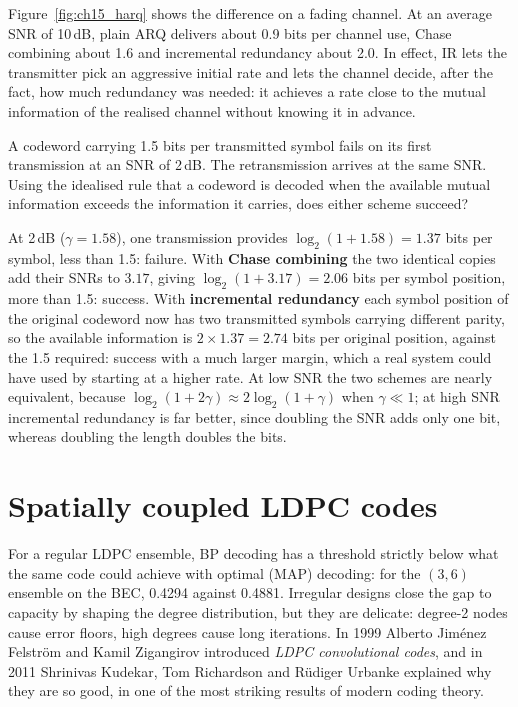 Figure~\ref{fig:ch15_harq} shows the difference on a fading channel. At an average SNR of 10\,dB,
plain ARQ delivers about 0.9 bits per channel use, Chase combining about 1.6 and incremental redundancy
about 2.0. In effect, IR lets the transmitter pick an aggressive initial rate and lets the channel
decide, after the fact, how much redundancy was needed: it achieves a rate close to the mutual
information of the realised channel without knowing it in advance.

\begin{worked}
A codeword carrying 1.5 bits per transmitted symbol fails on its first transmission at an SNR of
2\,dB. The retransmission arrives at the same SNR. Using the idealised rule that a codeword is decoded
when the available mutual information exceeds the information it carries, does either scheme
succeed?

At 2\,dB ($\gamma=1.58$), one transmission provides $\log_2(1+1.58)=1.37$ bits per symbol, less than
1.5: failure. With \textbf{Chase combining} the two identical copies add their SNRs to $3.17$, giving
$\log_2(1+3.17)=2.06$ bits per symbol position, more than 1.5: success. With \textbf{incremental
redundancy} each symbol position of the original codeword now has two transmitted symbols carrying
different parity, so the available information is $2\times1.37=2.74$ bits per original position,
against the 1.5 required: success with a much larger margin, which a real system could have used by
starting at a higher rate. At low SNR the two schemes are nearly equivalent, because
$\log_2(1+2\gamma)\approx2\log_2(1+\gamma)$ when $\gamma\ll1$; at high SNR incremental redundancy is
far better, since doubling the SNR adds only one bit, whereas doubling the length doubles the bits.
\end{worked}

\section{Spatially coupled LDPC codes}
\label{sec:ch15:sc}

For a regular LDPC ensemble, BP decoding has a threshold strictly below what the same code could
achieve with optimal (MAP) decoding: for the $(3,6)$ ensemble on the BEC, 0.4294 against 0.4881.
Irregular designs close the gap to capacity by shaping the degree distribution, but they are
delicate: degree-2 nodes cause error floors, high degrees cause long iterations. In 1999 Alberto
Jim\'enez Felstr\"om and Kamil Zigangirov introduced \emph{LDPC convolutional codes}, and in 2011
Shrinivas Kudekar, Tom Richardson and R\"udiger Urbanke explained why they are so good, in one of the
most striking results of modern coding theory.

